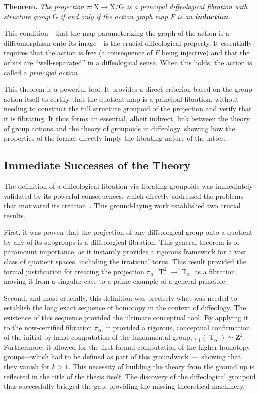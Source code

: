 \documentclass[10pt,reqno,letterpaper,twoside]{amsart}
\theoremstyle{article}
\newenvironment{theorem}[1]%
{\noindent\textbf{Theorem#1.} \it}%
{}
\newcommand{\ZZ}{\mathbf{Z}}
\newcommand{\eF}{{F}}
\def \G{\mathrm G}
\def \X{\mathrm X}
\newcommand{\Torus}{\operatorname{T}}
\begin{document}
  \begin{theorem}{}
    The projection $\pi: \X \to \X/\G$ is a principal diffeological fibration with structure group $\G$ if and only if the action graph map $\eF$ is an \textbf{induction}.
  \end{theorem}
  
  This condition—that the map parameterizing the graph of the action is a diffeomorphism onto its image—is the crucial diffeological property.
  It essentially requires that the action is free (a consequence of $\eF$ being injective) and that the orbits are ``well-separated'' in a diffeological sense.
  When this holds,
  the action is called a \emph{principal action}.
  
  This theorem is a powerful tool.
  It provides a direct criterion based on the group action itself to certify that the quotient map is a principal fibration,
  without needing to construct the full structure groupoid of the projection and verify that it is fibrating.
  It thus forms an essential,
  albeit indirect,
  link between the theory of group actions and the theory of groupoids in diffeology,
  showing how the properties of the former directly imply the fibrating nature of the latter.
  
  \subsection{Immediate Successes of the Theory}
  
  The definition of a diffeological fibration via fibrating groupoids was immediately validated by its powerful consequences,
  which directly addressed the problems that motivated its creation~\cite{PIZ85}.
  This ground-laying work established two crucial results.
  
  First,
  it was proven that the projection of any diffeological group onto a quotient by any of its subgroups is a diffeological fibration.
  This general theorem is of paramount importance, as it instantly provides a rigorous framework for a vast class of quotient spaces,
  including the irrational torus. This result provided the formal justification for treating the projection $\pi_\alpha : \Torus^2 \to \Torus_\alpha$ as a fibration,
  moving it from a singular case to a prime example of a general principle.
  
  Second,
  and most crucially,
  this definition was precisely what was needed to establish the long exact sequence of homotopy in the context of diffeology.
  The existence of this sequence provided the ultimate conceptual tool.
  By applying it to the now-certified fibration $\pi_\alpha$,
  it provided a rigorous,
  conceptual confirmation of the initial by-hand computation of the fundamental group,
  $\pi_1(\Torus_\alpha) \simeq \ZZ^2$.
  Furthermore,
  it allowed for the first formal computation of the higher homotopy groups—which had to be defined as part of this groundwork
  ---~showing that they vanish for $k>1$.
  This necessity of building the theory from the ground up is reflected in the title of the thesis itself.
  The discovery of the diffeological groupoid thus successfully bridged the gap,
  providing the missing theoretical machinery.
  
\end{document}

